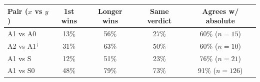 \begin{tabular}{lcccc}
\toprule
Pair ($x$ vs $y$) & 1st wins & Longer wins & Same verdict & Agrees w/ absolute \\
\midrule
A1 vs A0 & 13\% & 56\% & 27\% & 60\% ($n{=}15$) \\
A2 vs A1$^\dagger$ & 31\% & 63\% & 50\% & 60\% ($n{=}10$) \\
A1 vs S & 12\% & 51\% & 23\% & 76\% ($n{=}21$) \\
A1 vs S0 & 48\% & 79\% & 73\% & 91\% ($n{=}126$) \\
\bottomrule
\end{tabular}